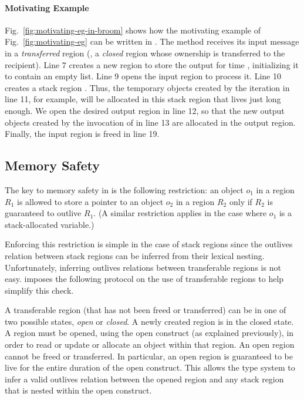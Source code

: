 \paragraph{Motivating Example}
Fig.~\ref{fig:motivating-eg-in-broom} shows how the motivating example
of Fig.~\ref{fig:motivating-eg} can be written in \name.
The  method receives its input message in a \emph{transferred}
region (\ie, a \emph{closed} region whose ownership is transferred to the
recipient).
Line 7 creates a new region to store the output for time ,
initializing it to contain an empty list.
Line 9 opens the input region to process it.
Line 10 creates a stack region .
Thus, the temporary objects created by the iteration in line 11,
for example, will be allocated in this stack region that lives just
long enough.
We open the desired output region in line 12, so that the new output
objects created by the invocation of  in line 13
are allocated in the output region.
Finally, the input region is freed in line 19.



\subsection{Memory Safety}
\label{sec:memory-safety}

The key to memory safety in \name is the following restriction:
an object $o_1$ in a region $R_1$ is allowed to store a pointer to
an object $o_2$ in a region $R_2$ only if $R_2$ is guaranteed to outlive $R_1$.
(A similar restriction applies in the case where $o_1$ is a stack-allocated variable.)

Enforcing this restriction is simple in the case of stack regions since the outlives relation
between stack regions can be inferred from their lexical nesting. Unfortunately,
inferring outlives relations between transferable regions is not easy.
\name imposes the following protocol on the use of transferable regions to help simplify
this check.

A transferable region (that has not been freed or transferred) can be in one of two possible
states, \emph{open} or \emph{closed}. A newly created region is in the closed state.
A region must be opened, using the open construct (as explained previously), in order
to read or update or allocate an object within that region.
An open region cannot be freed or transferred. 
In particular, an open region is guaranteed to be live for the entire duration of the open construct.
This allows the type system to infer a valid outlives relation between the opened region
and any stack region that is nested within the open construct.


